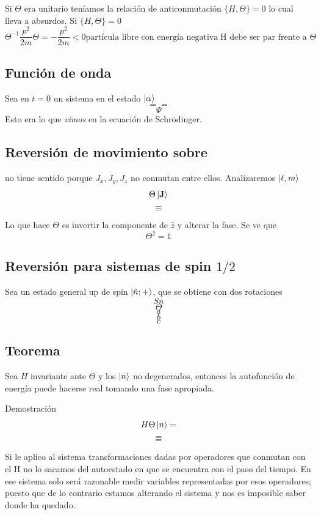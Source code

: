 \documentclass[10pt,oneside]{CBFT_book}
\begin{document}
Si $\Theta$ era unitario teníamos la relación de anticonmutación $\{ H, \Theta \}=0$ 
lo cual lleva a absurdos.
Si $\{ H,\Theta \} = 0$
\[
	\Theta^{-1} \frac{p^2}{2m} \Theta = - \frac{p^2}{2m} < 0
	\text{partícula libre con energía negativa} \; \text{H debe ser par frente a $\Theta$}
\]

\subsection{Función de onda}

Sea en $t=0$ un sistema en el estado $\Ket{\alpha}$
\[
	= = 
\]
\[
	\Psi
\]
Esto era lo que {\it vimos} en la ecuación de Schrödinger.

\subsection{Reversión de movimiento sobre }


no tiene sentido porque $J_x,J_y,J_z$ no conmutan entre ellos. Analizaremos $\Ket{\ell,m}$
\[
	\Theta \Ket{\vb{J}} 
\]
\[
	\equiv 
\]

Lo que hace $\Theta$ es invertir la componente de $\hat{z}$ y alterar la fase. Se ve que 
\[
	\Theta^2 = \mathbb{1}
\]

\subsection{Reversión para sistemas de spin $1/2$}

Sea un estado general up de spin $\Ket{\hat{n};+}$, que se obtiene con dos rotaciones 
\[
	Sn
\]
\[
	\Theta
\]
\[
	a
\]
\[
	b
\]
\[
	c
\]

\subsection{Teorema}

Sea $H$ invariante ante $\Theta$ y los $\Ket{n}$ no degenerados, entonces la autofunción de energía puede 
hacerse real tomando una fase apropiada.

Demostración 
\[
	H \Theta  \Ket{n} =
\]
\[
	=
\]
\[
	=
\]

Si le aplico al sistema transformaciones dadas por operadores que conmutan con el H no lo sacamos del 
autoestado en que se encuentra con el paso del tiempo.
En ese sistema solo será razonable medir variables representadas por esos operadores; puesto que de lo 
contrario estamos alterando el sistema y nos es imposible saber donde ha quedado.



\end{document}
